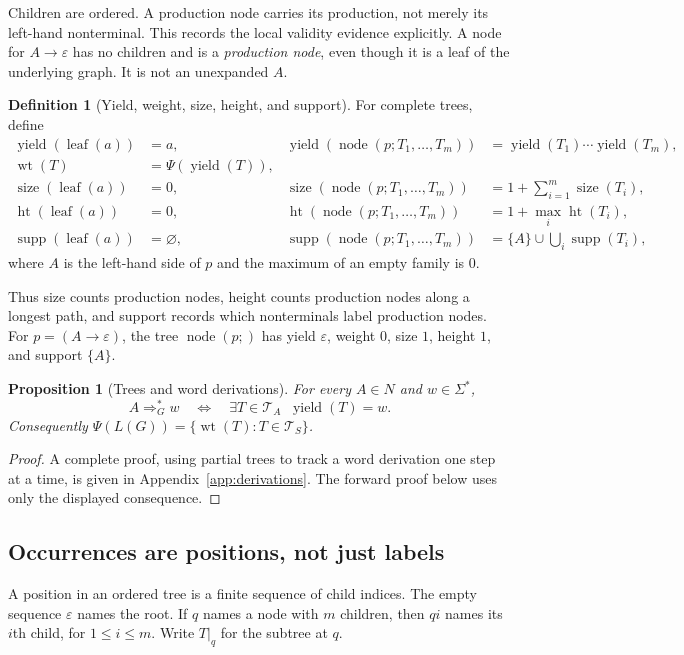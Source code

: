 \documentclass[11pt,a4paper]{article}
\numberwithin{equation}{section}
\theoremstyle{plain}
\newtheorem{proposition}[theorem]{Proposition}
\theoremstyle{definition}
\newtheorem{definition}[theorem]{Definition}
\theoremstyle{remark}
\newcommand{\eps}{\varepsilon}
\newcommand{\wt}{\operatorname{wt}}
\newcommand{\supp}{\operatorname{supp}}
\newcommand{\treeheight}{\operatorname{ht}}
\newcommand{\sz}{\operatorname{size}}
\newcommand{\yield}{\operatorname{yield}}
\newcommand{\Trees}{\mathcal T}
\begin{document}
Children are ordered. A production node carries its production, not merely its left-hand nonterminal. This records the local validity evidence explicitly. A node for $A\to\eps$ has no children and is a \emph{production node}, even though it is a leaf of the underlying graph. It is not an unexpanded $A$.

\begin{definition}[Yield, weight, size, height, and support]\label{def:statistics}
For complete trees, define
\begin{align*}
\yield(\operatorname{leaf}(a))&=a,&
\yield(\operatorname{node}(p;T_1,\ldots,T_m))&=\yield(T_1)\cdots\yield(T_m),\\
\wt(T)&=\Psi(\yield(T)),\\
\sz(\operatorname{leaf}(a))&=0,&
\sz(\operatorname{node}(p;T_1,\ldots,T_m))&=1+\sum_{i=1}^m\sz(T_i),\\
\treeheight(\operatorname{leaf}(a))&=0,&
\treeheight(\operatorname{node}(p;T_1,\ldots,T_m))&=1+\max_i\treeheight(T_i),\\
\supp(\operatorname{leaf}(a))&=\varnothing,&
\supp(\operatorname{node}(p;T_1,\ldots,T_m))&=\{A\}\cup\bigcup_i\supp(T_i),
\end{align*}
where $A$ is the left-hand side of $p$ and the maximum of an empty family is $0$.
\end{definition}

Thus size counts production nodes, height counts production nodes along a longest path, and support records which nonterminals label production nodes. For $p=(A\to\eps)$, the tree $\operatorname{node}(p;)$ has yield $\eps$, weight $0$, size $1$, height $1$, and support $\{A\}$.

\begin{proposition}[Trees and word derivations]\label{prop:tree-word}
For every $A\in N$ and $w\in\Sigma^*$,
\[
A\Rightarrow_G^*w
\quad\Longleftrightarrow\quad
\exists T\in\Trees_A\;\;\yield(T)=w.
\]
Consequently $\Psi(L(G))=\{\wt(T):T\in\Trees_S\}$.
\end{proposition}
\begin{proof}
A complete proof, using partial trees to track a word derivation one step at a time, is given in Appendix~\ref{app:derivations}. The forward proof below uses only the displayed consequence.
\end{proof}

\subsection{Occurrences are positions, not just labels}
A position in an ordered tree is a finite sequence of child indices. The empty sequence $\eps$ names the root. If $q$ names a node with $m$ children, then $qi$ names its $i$th child, for $1\leq i\leq m$. Write $T|_q$ for the subtree at $q$.
\end{document}
